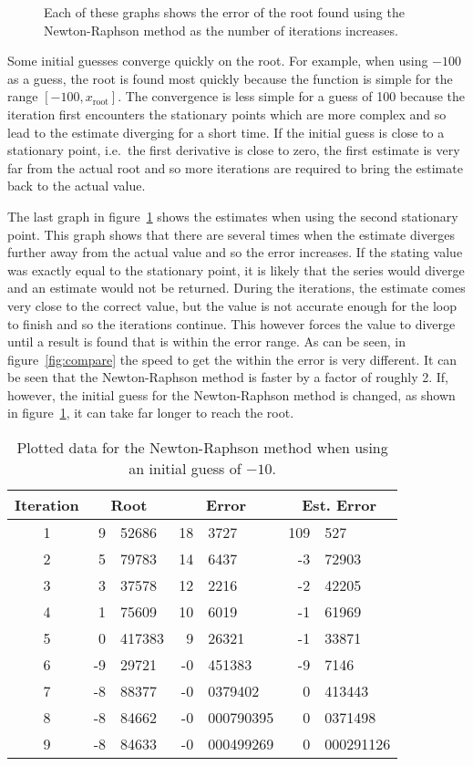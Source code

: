 \documentclass[11pt]{article} %
\newcommand{\inputTikZ}[1]{%
  }
\newcommand{\inputTikZ}[1]{%
    \beginpgfgraphicnamed{#1-external}%
    \endpgfgraphicnamed%
  }
\begin{document}
	\begin{figure}[ht]
		\centering
			\inputTikZ{Graph2}
		\caption{\label{fig:guesses}Each of these graphs shows the error of the root found using the Newton-Raphson method as the number of iterations increases.}
	\end{figure}
	 Some initial guesses converge quickly on the root. For example, when using $-100$ as a guess, the root is found most quickly because the function is simple for the range $[-100,x_{\text{root}}]$. The convergence is less simple for a guess of 100 because the iteration first encounters the stationary points which are more complex and so lead to the estimate diverging for a short time. If the initial guess is close to a stationary point, i.e.\ the first derivative is close to zero, the first estimate is very far from the actual root and so more iterations are required to bring the estimate back to the actual value. 

	 The last graph in figure~\ref{fig:guesses} shows the estimates when using the second stationary point. This graph shows that there are several times when the estimate diverges further away from the actual value and so the error increases. If the stating value was exactly equal to the stationary point, it is likely that the series would diverge and an estimate would not be returned. During the iterations, the estimate comes very close to the correct value, but the value is not accurate enough for the loop to finish and so the iterations continue. This however forces the value to diverge until a result is found that is within the error range. As can be seen, in figure~\ref{fig:compare} the speed to get the within the error is very different. It can be seen that the Newton-Raphson method is faster by a factor of roughly 2. If, however, the initial guess for the Newton-Raphson method is changed, as shown in figure~\ref{fig:guesses}, it can take far longer to reach the root.
	\begin{table}[ht]
		\centering
		\begin{tabular}{c|r@{.}l|r@{.}l|r@{.}l}
			Iteration &\multicolumn{2}{c}{Root} &\multicolumn{2}{|c}{Error} &\multicolumn{2}{|c}{Est. Error} \\ \hline \hline
			1	&9&52686	&18&3727	&109&527 \\
			2	&5&79783	&14&6437	&-3&72903 \\
			3	&3&37578	&12&2216	&-2&42205 \\
			4	&1&75609	&10&6019	&-1&61969 \\
			5	&0&417383	&9&26321	&-1&33871 \\
			6	&-9&29721	&-0&451383	&-9&7146 \\
			7	&-8&88377	&-0&0379402	&0&413443 \\
			8	&-8&84662	&-0&000790395	&0&0371498 \\
			9	&-8&84633	&-0&000499269	&0&000291126 \\
		\end{tabular}
		\caption{Plotted data for the Newton-Raphson method when using an initial guess of $-10$.}
		\label{tab:myfirsttable}
	\end{table}
\end{document}
